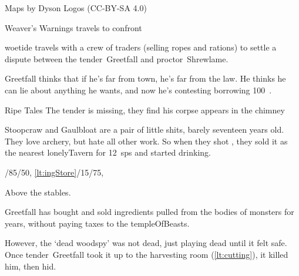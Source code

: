 \documentclass[10pt,twoside]{book}
\begin{document}

Maps by Dyson Logos (CC-BY-SA 4.0)




{Weaver's Warnings}%
{ travels to confront }%

\pagestyle{minizine}%

\Gls{woetide} travels with a crew of traders (selling ropes and \glspl{ration}) to settle a dispute between the \gls{tender}~Greetfall and \gls{proctor}~Shrewlame.

\begin{speechtext}
  Greetfall thinks that if he's far from town, he's far from the law.
  He thinks he can lie about anything he wants, and now he's contesting borrowing 100~.
\end{speechtext}

{Ripe Tales}%
{The \gls{tender} is missing, they find his corpse appears in the chimney}%

Stoopcraw and Gaulbloat are a pair of little shits, barely seventeen years old.
They love archery, but hate all other work.
So when they shot , they sold it as the nearest \gls{lonelyTavern} for 12~\glspl{sp} and started drinking.

%
  {%
    /85/50,%
    \ref{lt:ingStore}/15/75,
  }%
  {Above the stables.\par}

Greetfall has bought and sold \glspl{ingredient} pulled from the bodies of \glspl{monster} for years, without paying taxes to the \gls{templeOfBeasts}.

However, the `dead \gls{woodspy}' was not dead, just playing dead until it felt safe.
Once \gls{tender}~Greetfall took it up to the \gls{harvesting} room (\vref{lt:cutting}), it killed him, then hid.

\end{document}
